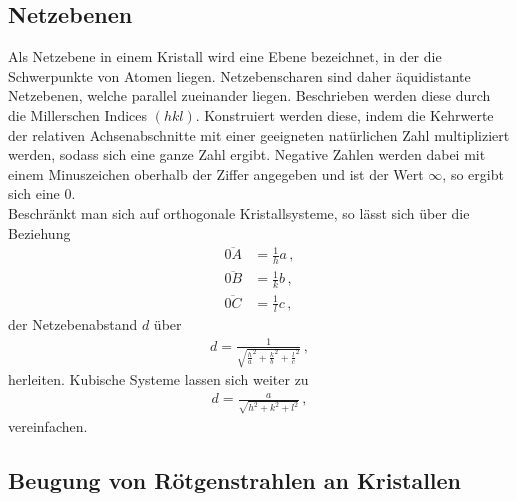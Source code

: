 \subsection{Netzebenen} %
\label{sub:netzebenen}

Als Netzebene in einem Kristall wird eine Ebene bezeichnet, in der die Schwerpunkte von Atomen liegen.
Netzebenscharen sind daher äquidistante Netzebenen, welche parallel zueinander liegen.
Beschrieben werden diese durch die Millerschen Indices $(hkl)$.
Konstruiert werden diese, indem die Kehrwerte der relativen Achsenabschnitte mit einer geeigneten natürlichen Zahl multipliziert werden, sodass sich eine ganze Zahl ergibt.
Negative Zahlen werden dabei mit einem Minuszeichen oberhalb der Ziffer angegeben und ist der Wert $\infty$, so ergibt sich eine $0$.
\\
Beschränkt man sich auf orthogonale Kristallsysteme, so lässt sich über die Beziehung
\begin{align*}
    \overline{0A} &= \frac{1}{h} a\,,\\
    \overline{0B} &= \frac{1}{k} b\,,\\
    \overline{0C} &= \frac{1}{l} c\,,
\end{align*}
der Netzebenabstand $d$ über
\begin{align*}
    d = \frac{1}{\sqrt{\frac{h}{a}^2 + \frac{k}{b}^2 + \frac{l}{c}^2}}\,,
\end{align*}
herleiten.
Kubische Systeme lassen sich weiter zu
\begin{align*}
    d = \frac{a}{\sqrt{h^2 + k^2 + l^2}}\,,
\end{align*}
vereinfachen.

\subsection{Beugung von Rötgenstrahlen an Kristallen} %
\label{sub:beugung_von_rötgenstrahlen_an_kristallen}

